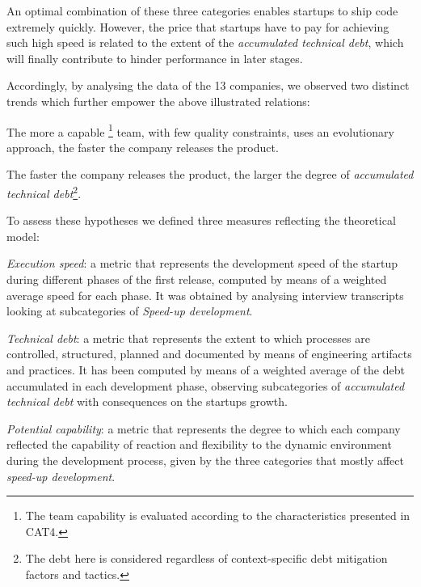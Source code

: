 \documentclass[10pt,journal,letterpaper,compsoc]{IEEEtran}
\begin{document}
An optimal combination of these three categories enables startups to ship code extremely quickly. However, the price that startups have to pay for achieving such high speed is related to the extent of the \textit{accumulated technical debt}, which will finally contribute to hinder performance in later stages.


Accordingly, by analysing the data of the 13 companies, we observed two distinct trends which further empower the above illustrated relations:

\begin{compactenum}
\item The more a capable \footnote{The team capability is evaluated according to the characteristics presented in CAT4.} team, with few quality constraints, uses an evolutionary approach, the faster the company releases the product.
\item The faster the company releases the product, the larger the degree of \textit{accumulated technical debt}\footnote{The debt here is considered regardless of context-specific debt mitigation factors and tactics.}.
\end{compactenum}

To assess these hypotheses we defined three measures reflecting the theoretical model:

\begin{compactitem}

\item \textit{Execution speed}: a metric that represents the development speed of the startup during different phases of the first release, computed by means of a weighted average speed for each phase. It was obtained by analysing interview transcripts looking at subcategories of \textit{Speed-up development}.

\item \textit{Technical debt}: a metric that represents the extent to which processes are controlled, structured, planned and documented by means of engineering artifacts and practices. It has been computed by means of a weighted average of the debt accumulated in each development phase, observing subcategories of  \textit{accumulated technical debt} with consequences on the startups growth.

\item \textit{Potential capability}: a metric that represents the degree to which each company reflected the capability of reaction and flexibility to the dynamic environment during the development process, given by the three categories that mostly affect \textit{speed-up development}.
\end{compactitem}
\end{document}
